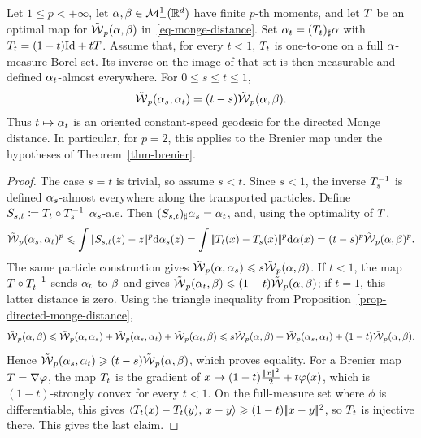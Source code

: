 \begin{prop}\label{prop-monge-displacement-geodesic}
	Let $1\leq p<+\infty$, let $\alpha,\beta\in\mathcal{M}_+^1(\mathbb{R}^d)$ have finite $p$-th moments, and let $T$ be an optimal map for $\tilde{\operatorname{\mathcal{W}}}_p(\alpha,\beta)$ in~\eqref{eq-monge-distance}. Set $\alpha_t=(T_t)_\sharp\alpha$ with $T_t=(1-t)\mathrm{Id}+tT$. Assume that, for every $t<1$, $T_t$ is one-to-one on a full $\alpha$-measure Borel set. Its inverse on the image of that set is then measurable and defined $\alpha_t$-almost everywhere. For $0\leq s\leq t\leq1$,
	\[
		\tilde{\operatorname{\mathcal{W}}}_p(\alpha_s,\alpha_t)=(t-s)\tilde{\operatorname{\mathcal{W}}}_p(\alpha,\beta).
	\]
	Thus $t\mapsto\alpha_t$ is an oriented constant-speed geodesic for the directed Monge distance. In particular, for $p=2$, this applies to the Brenier map under the hypotheses of Theorem~\ref{thm-brenier}.
\end{prop}
\begin{proof}
	The case $s=t$ is trivial, so assume $s<t$. Since $s<1$, the inverse $T_s^{-1}$ is defined $\alpha_s$-almost everywhere along the transported particles. Define
	$S_{s,t}\coloneqq T_t\circ T_s^{-1}$ $\alpha_s$-a.e.
	Then $(S_{s,t})_\sharp\alpha_s=\alpha_t$, and, using the optimality of $T$,
	\[
		\tilde{\operatorname{\mathcal{W}}}_p(\alpha_s,\alpha_t)^p
		\leqslant
		\int |\!| S_{s,t}(z)-z |\!|^p\mathrm{d}\alpha_s(z)
		=
		\int |\!| T_t(x)-T_s(x) |\!|^p\mathrm{d}\alpha(x)
		=
		(t-s)^p\tilde{\operatorname{\mathcal{W}}}_p(\alpha,\beta)^p.
	\]
	The same particle construction gives $\tilde{\operatorname{\mathcal{W}}}_p(\alpha,\alpha_s)\leqslant s\tilde{\operatorname{\mathcal{W}}}_p(\alpha,\beta)$. If $t<1$, the map $T\circ T_t^{-1}$ sends $\alpha_t$ to $\beta$ and gives $\tilde{\operatorname{\mathcal{W}}}_p(\alpha_t,\beta)\leqslant(1-t)\tilde{\operatorname{\mathcal{W}}}_p(\alpha,\beta)$; if $t=1$, this latter distance is zero. Using the triangle inequality from Proposition~\ref{prop-directed-monge-distance},
	\[
		\tilde{\operatorname{\mathcal{W}}}_p(\alpha,\beta)
		\leqslant
		\tilde{\operatorname{\mathcal{W}}}_p(\alpha,\alpha_s)+\tilde{\operatorname{\mathcal{W}}}_p(\alpha_s,\alpha_t)+\tilde{\operatorname{\mathcal{W}}}_p(\alpha_t,\beta)
		\leqslant
		s\tilde{\operatorname{\mathcal{W}}}_p(\alpha,\beta)+\tilde{\operatorname{\mathcal{W}}}_p(\alpha_s,\alpha_t)+(1-t)\tilde{\operatorname{\mathcal{W}}}_p(\alpha,\beta).
	\]
	Hence $\tilde{\operatorname{\mathcal{W}}}_p(\alpha_s,\alpha_t)\geqslant(t-s)\tilde{\operatorname{\mathcal{W}}}_p(\alpha,\beta)$, which proves equality. For a Brenier map $T=\nabla\varphi$, the map $T_t$ is the gradient of
	\(x\mapsto (1-t)\frac{|\!| x |\!|^2}{2}+t\varphi(x)\),
	which is $(1-t)$-strongly convex for every $t<1$. On the full-measure set where $\phi$ is differentiable, this gives
	$\langle T_t(x)-T_t(y),\,x-y\rangle\geqslant(1-t)|\!| x-y |\!|^2$, so $T_t$ is injective there. This gives the last claim.
\end{proof}

